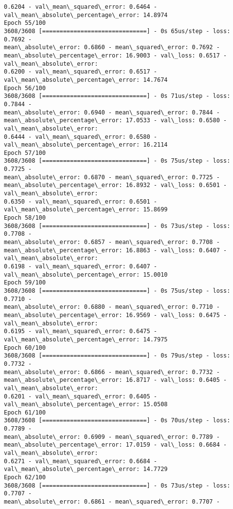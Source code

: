 \documentclass[11pt]{article}
\begin{document}
\begin{Verbatim}[commandchars=\\\{\},fontsize=\footnotesize]
0.6204 - val\_mean\_squared\_error: 0.6464 - val\_mean\_absolute\_percentage\_error: 14.8974
Epoch 55/100
3608/3608 [==============================] - 0s 65us/step - loss: 0.7692 -
mean\_absolute\_error: 0.6860 - mean\_squared\_error: 0.7692 -
mean\_absolute\_percentage\_error: 16.9003 - val\_loss: 0.6517 - val\_mean\_absolute\_error:
0.6200 - val\_mean\_squared\_error: 0.6517 - val\_mean\_absolute\_percentage\_error: 14.7674
Epoch 56/100
3608/3608 [==============================] - 0s 71us/step - loss: 0.7844 -
mean\_absolute\_error: 0.6940 - mean\_squared\_error: 0.7844 -
mean\_absolute\_percentage\_error: 17.0533 - val\_loss: 0.6580 - val\_mean\_absolute\_error:
0.6444 - val\_mean\_squared\_error: 0.6580 - val\_mean\_absolute\_percentage\_error: 16.2114
Epoch 57/100
3608/3608 [==============================] - 0s 75us/step - loss: 0.7725 -
mean\_absolute\_error: 0.6870 - mean\_squared\_error: 0.7725 -
mean\_absolute\_percentage\_error: 16.8932 - val\_loss: 0.6501 - val\_mean\_absolute\_error:
0.6350 - val\_mean\_squared\_error: 0.6501 - val\_mean\_absolute\_percentage\_error: 15.8699
Epoch 58/100
3608/3608 [==============================] - 0s 73us/step - loss: 0.7708 -
mean\_absolute\_error: 0.6857 - mean\_squared\_error: 0.7708 -
mean\_absolute\_percentage\_error: 16.8863 - val\_loss: 0.6407 - val\_mean\_absolute\_error:
0.6198 - val\_mean\_squared\_error: 0.6407 - val\_mean\_absolute\_percentage\_error: 15.0010
Epoch 59/100
3608/3608 [==============================] - 0s 75us/step - loss: 0.7710 -
mean\_absolute\_error: 0.6880 - mean\_squared\_error: 0.7710 -
mean\_absolute\_percentage\_error: 16.9569 - val\_loss: 0.6475 - val\_mean\_absolute\_error:
0.6195 - val\_mean\_squared\_error: 0.6475 - val\_mean\_absolute\_percentage\_error: 14.7975
Epoch 60/100
3608/3608 [==============================] - 0s 79us/step - loss: 0.7732 -
mean\_absolute\_error: 0.6866 - mean\_squared\_error: 0.7732 -
mean\_absolute\_percentage\_error: 16.8717 - val\_loss: 0.6405 - val\_mean\_absolute\_error:
0.6201 - val\_mean\_squared\_error: 0.6405 - val\_mean\_absolute\_percentage\_error: 15.0508
Epoch 61/100
3608/3608 [==============================] - 0s 70us/step - loss: 0.7789 -
mean\_absolute\_error: 0.6909 - mean\_squared\_error: 0.7789 -
mean\_absolute\_percentage\_error: 17.0159 - val\_loss: 0.6684 - val\_mean\_absolute\_error:
0.6271 - val\_mean\_squared\_error: 0.6684 - val\_mean\_absolute\_percentage\_error: 14.7729
Epoch 62/100
3608/3608 [==============================] - 0s 73us/step - loss: 0.7707 -
mean\_absolute\_error: 0.6861 - mean\_squared\_error: 0.7707 -

\end{Verbatim}
\end{document}

